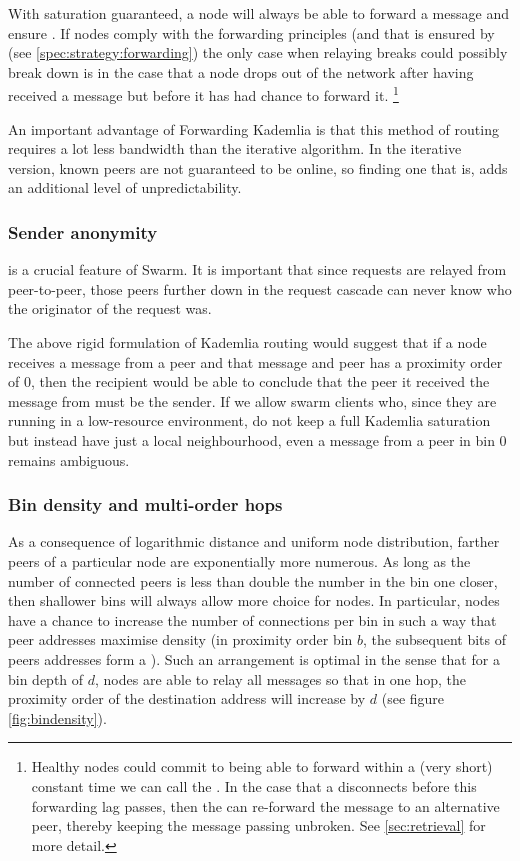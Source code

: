 With  saturation guaranteed, a node will always be able to forward a message and ensure . If nodes comply with the forwarding principles (and that is ensured by  (see \ref{spec:strategy:forwarding}) the only case when relaying breaks could possibly break down is in the case that a node drops out of the network after having received a message but before it has had chance to forward it.%
%
\footnote{Healthy nodes could commit to being able to forward within a (very short) constant time we can call the . In the case that a  disconnects before this forwarding lag passes, then the  can re-forward the message to an alternative peer, thereby keeping the message passing unbroken. See \ref{sec:retrieval} for more detail.
} 

An important advantage of Forwarding Kademlia is that this method of routing requires a lot less bandwidth than the iterative algorithm. In the iterative version, known peers are not guaranteed to be online, so finding one that is, adds an additional level of unpredictability.

\subsubsection{Sender anonymity}
 is a crucial feature of  Swarm. It is important that since requests are relayed from peer-to-peer, those peers further down in the request cascade can never know who the originator of the request was. 

The above rigid formulation of Kademlia routing would suggest that if a node receives a message from a peer and that message and peer has a proximity order of $0$, then the recipient would be able to conclude that the peer it received the message from must be the sender. If we allow  swarm clients who, since they are running in a low-resource environment, do not keep a full Kademlia saturation but instead have just a local neighbourhood, even a message from a peer in bin $0$ remains ambiguous. 

\subsubsection{Bin density and multi-order hops} \label{sec:bindensity}

As a consequence of logarithmic distance and uniform node distribution, farther peers of a particular node are exponentially more numerous. 
As long as the number of connected peers is less than double the number in the bin one closer, then shallower bins will always allow more choice for nodes. In particular, nodes have a chance to increase the number of connections per bin in such a way that peer addresses maximise density (in proximity order bin $b$, the subsequent bits of peers addresses form a ). Such an arrangement is optimal in the sense that for a bin depth of $d$, nodes are able to relay all messages so that in one hop, the proximity order of the destination address will increase by $d$ (see figure \ref{fig:bindensity}). 


